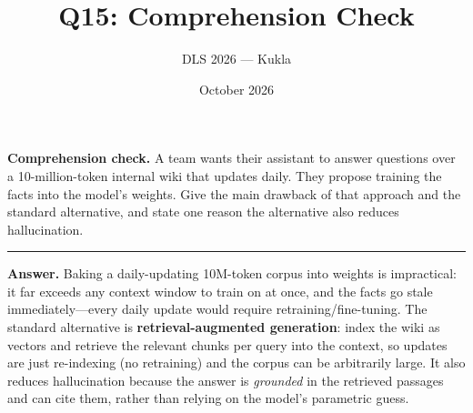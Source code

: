 \documentclass[11pt]{article}
\title{Q15: Comprehension Check}
\author{DLS 2026 --- Kukla}
\date{October 2026}
\begin{document}
\maketitle
\textbf{Comprehension check.} A team wants their assistant to answer questions over a 10-million-token
internal wiki that updates daily. They propose training the facts into the model's weights. Give the main
drawback of that approach and the standard alternative, and state one reason the alternative also reduces
hallucination.

\vspace{0.8cm}\hrule\vspace{4pt}
{\small\textbf{Answer.} Baking a daily-updating 10M-token corpus into weights is impractical: it far exceeds
any context window to train on at once, and the facts go stale immediately---every daily update would
require retraining/fine-tuning. The standard alternative is \textbf{retrieval-augmented generation}: index
the wiki as vectors and retrieve the relevant chunks per query into the context, so updates are just
re-indexing (no retraining) and the corpus can be arbitrarily large. It also reduces hallucination because
the answer is \emph{grounded} in the retrieved passages and can cite them, rather than relying on the
model's parametric guess.}
\end{document}
